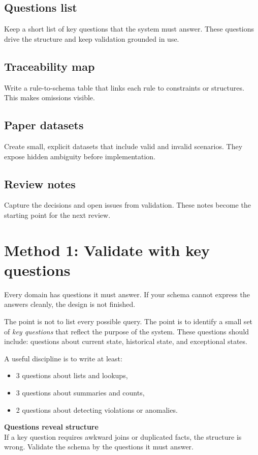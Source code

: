 \subsection{Questions list}
Keep a short list of key questions that the system must answer.
These questions drive the structure and keep validation grounded in use.

\subsection{Traceability map}
Write a rule-to-schema table that links each rule to constraints or structures.
This makes omissions visible.

\subsection{Paper datasets}
Create small, explicit datasets that include valid and invalid scenarios.
They expose hidden ambiguity before implementation.

\subsection{Review notes}
Capture the decisions and open issues from validation.
These notes become the starting point for the next review.

\section{Method 1: Validate with key questions}
Every domain has questions it must answer.
If your schema cannot express the answers cleanly, the design is not finished.

The point is not to list every possible query.
The point is to identify a small set of \emph{key questions} that reflect the purpose of the system.
These questions should include:
questions about current state, historical state, and exceptional states.

A useful discipline is to write at least:
\begin{itemize}[leftmargin=*,nosep]
  \item 3 questions about lists and lookups,
  \item 3 questions about summaries and counts,
  \item 2 questions about detecting violations or anomalies.
\end{itemize}

\begin{principlebox}
\textbf{Questions reveal structure}\\
If a key question requires awkward joins or duplicated facts, the structure is wrong.
Validate the schema by the questions it must answer.
\end{principlebox}


